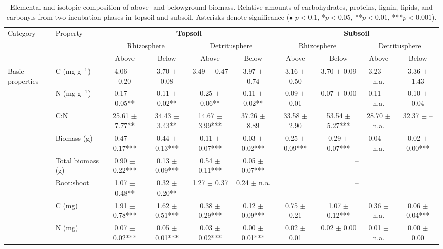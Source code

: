 \begin{table}
  \centering
  \scriptsize
  \caption{Elemental and isotopic composition of above- and belowground biomass. Relative amounts of carbohydrates, proteins, lignin, lipids, and carbonyls from two incubation phases in topsoil and subsoil. Asterisks denote significance ($\bullet$ $p < 0.1$, *$p < 0.05$, **$p < 0.01$, ***$p < 0.001$).}
  \begin{tabular}{llcccccccc}
  \toprule
  \multirow{3}{*}{Category} & \multirow{3}{*}{Property} & \multicolumn{4}{c}{\textbf{Topsoil}} & \multicolumn{4}{c}{\textbf{Subsoil}} \\
  \cmidrule(lr){3-6} \cmidrule(lr){7-10}
  & & \multicolumn{2}{c}{Rhizosphere} & \multicolumn{2}{c}{Detritusphere} & \multicolumn{2}{c}{Rhizosphere} & \multicolumn{2}{c}{Detritusphere} \\
  \cmidrule(lr){3-4} \cmidrule(lr){5-6} \cmidrule(lr){7-8} \cmidrule(lr){9-10}
  & & Above & Below & Above & Below & Above & Below & Above & Below \\
  \midrule
  \multirow{8}{*}{Basic properties}
  & C (mg g$^{-1}$) & 4.06 $\pm$ 0.20 & 3.70 $\pm$ 0.08 & 3.49 $\pm$ 0.47 & 3.97 $\pm$ 0.74 & 3.16 $\pm$ 0.50 & 3.70 $\pm$ 0.09 & 3.23 $\pm$ n.a. & 3.36 $\pm$ 1.43 \\
  & N (mg g$^{-1}$) & 0.17 $\pm$ 0.05** & 0.11 $\pm$ 0.02** & 0.25 $\pm$ 0.06** & 0.11 $\pm$ 0.02** & 0.09 $\pm$ 0.01 & 0.07 $\pm$ 0.00 & 0.11 $\pm$ n.a. & 0.10 $\pm$ 0.04 \\
  & C:N & 25.61 $\pm$ 7.77** & 34.43 $\pm$ 3.43** & 14.67 $\pm$ 3.99*** & 37.26 $\pm$ 8.89 & 33.58 $\pm$ 2.90 & 53.54 $\pm$ 5.27*** & 28.70 $\pm$ n.a. & 32.37 $\pm$ -- \\
  & Biomass (g) & 0.47 $\pm$ 0.17*** & 0.44 $\pm$ 0.13*** & 0.11 $\pm$ 0.07*** & 0.03 $\pm$ 0.02*** & 0.25 $\pm$ 0.09*** & 0.29 $\pm$ 0.07*** & 0.04 $\pm$ n.a. & 0.02 $\pm$ 0.00*** \\
  & Total biomass (g) & 0.90 $\pm$ 0.22*** & 0.13 $\pm$ 0.09*** & 0.54 $\pm$ 0.11*** & 0.05 $\pm$ 0.07*** & \multicolumn{4}{c}{--} \\
  & Root:shoot & 1.07 $\pm$ 0.48** & 0.32 $\pm$ 0.20** & 1.27 $\pm$ 0.37 & 0.24 $\pm$ n.a. & \multicolumn{4}{c}{--} \\
  & C (mg) & 1.91 $\pm$ 0.78*** & 1.62 $\pm$ 0.51*** & 0.38 $\pm$ 0.29*** & 0.12 $\pm$ 0.09*** & 0.75 $\pm$ 0.21 & 1.07 $\pm$ 0.12*** & 0.36 $\pm$ n.a. & 0.06 $\pm$ 0.04*** \\
  & N (mg) & 0.07 $\pm$ 0.02*** & 0.05 $\pm$ 0.01*** & 0.03 $\pm$ 0.02*** & 0.00 $\pm$ 0.01*** & 0.02 $\pm$ 0.01 & 0.02 $\pm$ 0.00 & 0.01 $\pm$ n.a. & 0.00 $\pm$ 0.00 \\

\end{tabular}
\end{table}
